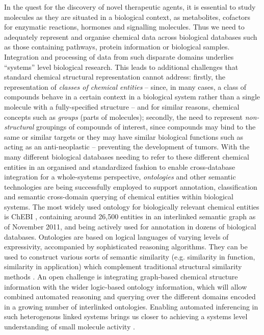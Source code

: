 \documentclass{sig-alternate}
\begin{document}
In the quest for the discovery of novel therapeutic agents, it is
essential to study molecules as they are situated in a biological
context, as metabolites, cofactors for enzymatic reactions, hormones
and signalling molecules. Thus we need to adequately represent and
organise chemical data across biological databases such as those
containing pathways, protein information or biological
samples. Integration and processing of data from such disparate
domains underlies ``systems'' level biological research.  This leads
to additional challenges that standard chemical structural
representation cannot address: firstly, the representation of
\textit{classes of chemical entities} -- since, in many cases, a class
of compounds behave in a certain context in a biological system rather
than a single molecule with a fully-specified structure -- and for
similar reasons, chemical concepts such as \textit{groups} (parts of
molecules); secondly, the need to represent \textit{non-structural}
groupings of compounds of interest, since compounds may bind to the
same or similar targets or they may have similar biological functions
such as acting as an anti-neoplastic -- preventing the development of
tumors. With the many different biological databases needing to refer
to these different chemical entities in an organised and standardized
fashion to enable cross-database integration for a whole-systems
perspective, \textit{ontologies} and other semantic technologies are
being successfully employed to support annotation, classification and
semantic cross-domain querying of chemical entities within biological
systems. The most widely used ontology for biologically relevant
chemical entities is ChEBI \cite{chebi2010}, containing around 26,500
entities in an interlinked semantic graph as of November 2011, and
being actively used for annotation in dozens of biological databases.
Ontologies are based on logical languages of varying levels of
expressivity, accompanied by sophisticated reasoning algorithms. They
can be used to construct various sorts of semantic similarity
(e.g. similarity in function, similarity in application) which
complement traditional structural similarity methods \cite{couto2010}.
An open challenge is integrating graph-based chemical structure
information with the wider logic-based ontology information, which
will allow combined automated reasoning and querying over the
different domains encoded in a growing number of interlinked
ontologies. %
Enabling automated inferencing in such heterogenous linked systems
brings us closer to achieving a systems level understanding of small
molecule activity \cite{Oprea:2007fk}.
\end{document}
